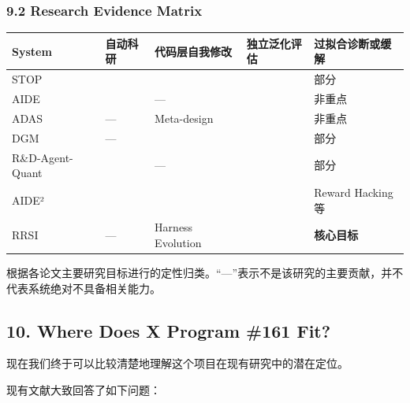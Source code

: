 \hypertarget{part-3-44-0001-research-evidence-matrix}{%
\subsubsection{9.2 Research Evidence Matrix}\label{part-3-44-0001-research-evidence-matrix}}

\begin{readertable}
\begin{longtable}[]{@{}
  >{\raggedright\arraybackslash}p{}
  >{\centering\arraybackslash}p{}
  >{\centering\arraybackslash}p{}
  >{\centering\arraybackslash}p{}
  >{\centering\arraybackslash}p{}@{}}
\toprule
System & 自动科研 & 代码层自我修改 & 独立泛化评估 & 过拟合诊断或缓解 \\
\midrule
\endhead
STOP & & & & 部分 \\
AIDE & & --- & & 非重点 \\
ADAS & --- & Meta-design & & 非重点 \\
DGM & --- & & & 部分 \\
R\&D-Agent-Quant & & --- & & 部分 \\
AIDE² & & & & Reward Hacking 等 \\
RRSI & --- & Harness Evolution & & \textbf{核心目标} \\
\bottomrule
\end{longtable}
\end{readertable}

根据各论文主要研究目标进行的定性归类。``---''表示不是该研究的主要贡献，并不代表系统绝对不具备相关能力。

\hypertarget{part-3-44-0001-where-does-x-program-161-fit}{%
\subsection{10. Where Does X Program \#161 Fit?}\label{part-3-44-0001-where-does-x-program-161-fit}}

现在我们终于可以比较清楚地理解这个项目在现有研究中的潜在定位。


现有文献大致回答了如下问题：

